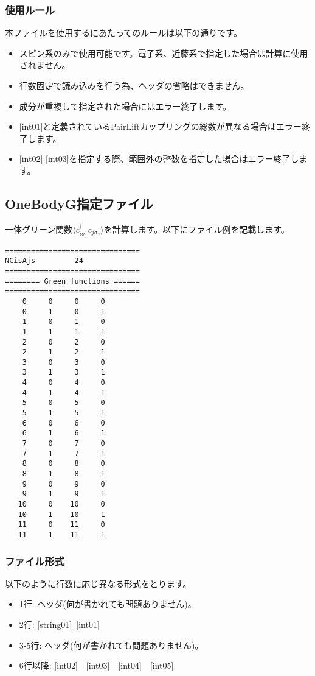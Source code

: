 \subsubsection{使用ルール}
本ファイルを使用するにあたってのルールは以下の通りです。
\begin{itemize}
\item スピン系のみで使用可能です。電子系、近藤系で指定した場合は計算に使用されません。
\item 行数固定で読み込みを行う為、ヘッダの省略はできません。
\item 成分が重複して指定された場合にはエラー終了します。
\item $[$int01$]$と定義されているPairLiftカップリングの総数が異なる場合はエラー終了します。
\item $[$int02$]$-$[$int03$]$を指定する際、範囲外の整数を指定した場合はエラー終了します。
\end{itemize}

\newpage
\subsection{OneBodyG指定ファイル}
\label{Subsec:onebodyg}
一体グリーン関数$\langle c_{i\sigma_1}^{\dagger}c_{j\sigma_2}\rangle$を計算します。以下にファイル例を記載します。

\begin{minipage}{12.5cm}
\begin{screen}
\begin{verbatim}
===============================
NCisAjs         24
===============================
======== Green functions ======
===============================
    0     0     0     0
    0     1     0     1
    1     0     1     0
    1     1     1     1
    2     0     2     0
    2     1     2     1
    3     0     3     0
    3     1     3     1
    4     0     4     0
    4     1     4     1
    5     0     5     0
    5     1     5     1
    6     0     6     0
    6     1     6     1
    7     0     7     0
    7     1     7     1
    8     0     8     0
    8     1     8     1
    9     0     9     0
    9     1     9     1
   10     0    10     0
   10     1    10     1
   11     0    11     0
   11     1    11     1
\end{verbatim}
\end{screen}
\end{minipage}

\subsubsection{ファイル形式}
以下のように行数に応じ異なる形式をとります。
 \begin{itemize}
   \item  1行:  ヘッダ(何が書かれても問題ありません)。
   \item  2行:   [string01]~[int01]
   \item  3-5行:  ヘッダ(何が書かれても問題ありません)。
   \item  6行以降: [int02]~~[int03]~~[int04]~~[int05]
  \end{itemize}

